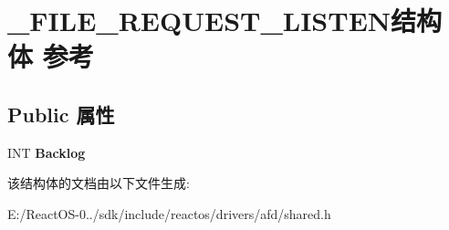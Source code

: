 \hypertarget{struct___f_i_l_e___r_e_q_u_e_s_t___l_i_s_t_e_n}{}\section{\+\_\+\+F\+I\+L\+E\+\_\+\+R\+E\+Q\+U\+E\+S\+T\+\_\+\+L\+I\+S\+T\+E\+N结构体 参考}
\label{struct___f_i_l_e___r_e_q_u_e_s_t___l_i_s_t_e_n}
\subsection*{Public 属性}
\begin{DoxyCompactItemize}
\item 
\mbox{\label{struct___f_i_l_e___r_e_q_u_e_s_t___l_i_s_t_e_n_a520e1a8848f3a886791513aa7a65f8d2}} 
I\+NT {\bfseries Backlog}
\end{DoxyCompactItemize}


该结构体的文档由以下文件生成\+:\begin{DoxyCompactItemize}
\item 
E\+:/\+React\+O\+S-\/0../sdk/include/reactos/drivers/afd/shared.\+h\end{DoxyCompactItemize}

